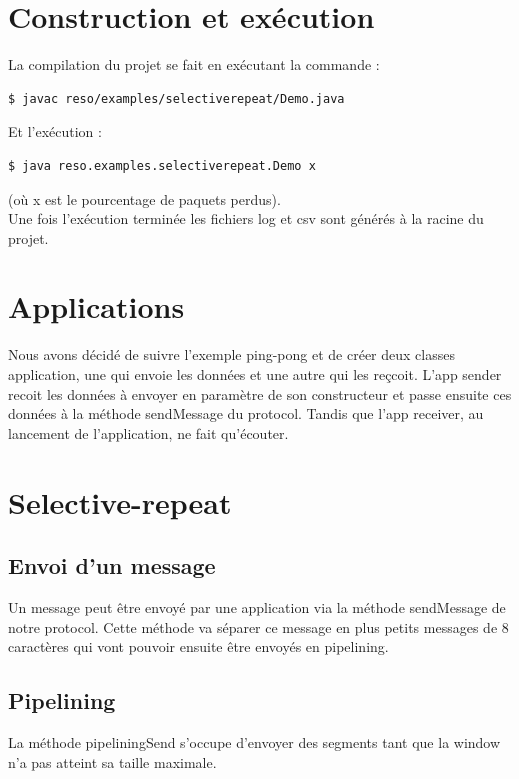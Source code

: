 \documentclass{article}
\begin{document}
\tableofcontents
\newpage


\section{Construction et exécution}

La compilation du projet se fait en exécutant la commande :
\begin{verbatim}
$ javac reso/examples/selectiverepeat/Demo.java
\end{verbatim}
Et l'exécution : 
\begin{verbatim}
$ java reso.examples.selectiverepeat.Demo x
\end{verbatim}
(où x est le pourcentage de paquets perdus).\\
Une fois l'exécution terminée les fichiers log et csv sont générés à la racine du projet.

\section{Applications}

Nous avons décidé de suivre l'exemple ping-pong et de créer deux classes application, une qui envoie les données et une autre qui les reçcoit.
L'app sender recoit les données à envoyer en paramètre de son constructeur et passe ensuite ces données à la méthode sendMessage du protocol. 
Tandis que l'app receiver, au lancement de l'application, ne fait qu'écouter.

\section{Selective-repeat}

\subsection{Envoi d'un message}

Un message peut être envoyé par une application via la méthode sendMessage de notre protocol. 
Cette méthode va séparer ce message en plus petits messages de 8 caractères qui vont pouvoir ensuite être envoyés en pipelining.

\subsection{Pipelining}

La méthode pipeliningSend s'occupe d'envoyer des segments tant que la window n'a pas atteint sa taille maximale.
\end{document}
